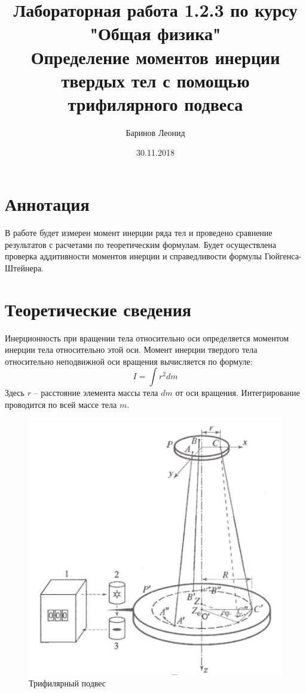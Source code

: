 \documentclass[a4paper,12pt]{article} %
\title{Лабораторная работа 1.2.3 по курсу \\ "Общая физика"  \\ 
\vspace{0.2cm}
\vspace{4.5cm}
 \LARGE{\textbf{Определение моментов инерции твердых тел с помощью трифилярного подвеса}}\vspace{5.5cm}}
\date{30.11.2018}
\author{\vspace{0.2cm}Баринов Леонид}
\begin{document}
\maketitle
\newpage
\section{Аннотация}
В работе будет измерен момент инерции ряда тел и проведено сравнение результатов с расчетами по теоретическим формулам. Будет осуществлена проверка аддитивности моментов инерции и справедливости формулы Гюйгенса-Штейнера.
\section{Теоретические сведения}
Инерционность при вращении тела относительно оси определяется моментом инерции тела относительно этой оси. Момент инерции твердого тела относительно неподвижной оси вращения вычисляется по формуле:
\begin{equation}
I = \int r^2dm
\end{equation}
Здесь $r$ -- расстояние элемента массы тела $dm$ от оси вращения. Интегрирование проводится по всей массе тела $m$.
\begin{figure}[h]
\centering
\includegraphics[scale=0.5]{1}
\caption{Трифилярный подвес}
\end{figure}
\end{document}
